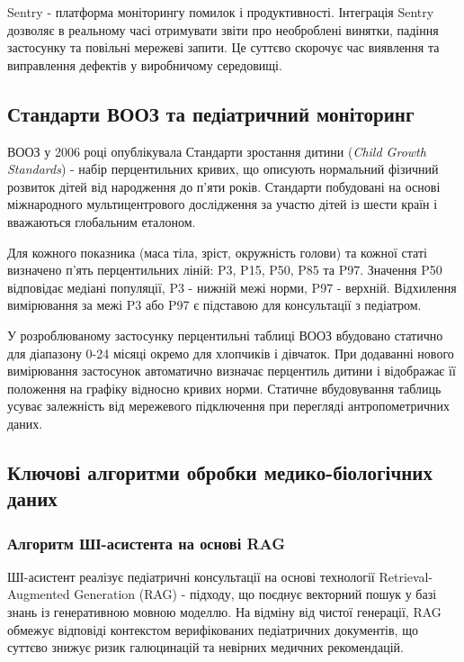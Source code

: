Sentry - платформа моніторингу помилок і продуктивності. Інтеграція Sentry дозволяє в реальному часі отримувати звіти про необроблені винятки, падіння застосунку та повільні мережеві запити. Це суттєво скорочує час виявлення та виправлення дефектів у виробничому середовищі.

\subsection{Стандарти ВООЗ та педіатричний моніторинг}

\gls{ВООЗ} у 2006 році опублікувала Стандарти зростання дитини (\textit{Child Growth Standards}) - набір перцентильних кривих, що описують нормальний фізичний розвиток дітей від народження до п'яти років. Стандарти побудовані на основі міжнародного мультицентрового дослідження за участю дітей із шести країн і вважаються глобальним еталоном.

Для кожного показника (маса тіла, зріст, окружність голови) та кожної статі визначено п'ять перцентильних ліній: P3, P15, P50, P85 та P97. Значення P50 відповідає медіані популяції, P3 - нижній межі норми, P97 - верхній. Відхилення вимірювання за межі P3 або P97 є підставою для консультації з педіатром.

У розроблюваному застосунку перцентильні таблиці \gls{ВООЗ} вбудовано статично для діапазону 0-24 місяці окремо для хлопчиків і дівчаток. При додаванні нового вимірювання застосунок автоматично визначає перцентиль дитини і відображає її положення на графіку відносно кривих норми. Статичне вбудовування таблиць усуває залежність від мережевого підключення при перегляді антропометричних даних.

\subsection{Ключові алгоритми обробки медико-біологічних даних}

\subsubsection{Алгоритм ШІ-асистента на основі RAG}

ШІ-асистент реалізує педіатричні консультації на основі технології Retrieval-Augmented Generation (\gls{RAG}) - підходу, що поєднує векторний пошук у базі знань із генеративною мовною моделлю. На відміну від чистої генерації, \gls{RAG} обмежує відповіді контекстом верифікованих педіатричних документів, що суттєво знижує ризик галюцинацій та невірних медичних рекомендацій.


